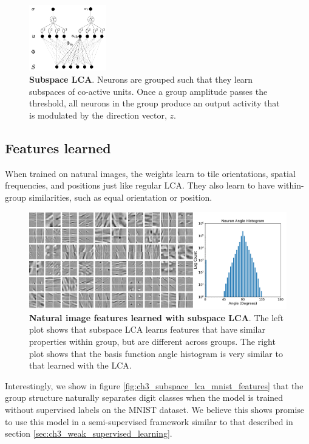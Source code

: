 \begin{figure}[h]
    \centering
    \includegraphics[width=0.3\textwidth]{figures/subspace_lca_graph.png}
    \caption{\textbf{Subspace LCA}. Neurons are grouped such that they learn subspaces of co-active units. Once a group amplitude passes the threshold, all neurons in the group produce an output activity that is modulated by the direction vector, $z$.}
    \label{fig:ch3_subspace_lca_graph}
\end{figure}

\subsection{Features learned}
When trained on natural images, the weights learn to tile orientations, spatial frequencies, and positions just like regular LCA. They also learn to have within-group similarities, such as equal orientation or position.

\begin{figure}[h]
    \centering
    \includegraphics[width=\textwidth]{figures/subspace_lca_vh_features.png}
    \caption{\textbf{Natural image features learned with subspace LCA}. The left plot shows that subspace LCA learns features that have similar properties within group, but are different across groups. The right plot shows that the basis function angle histogram is very similar to that learned with the LCA.}
    \label{fig:ch3_subspace_lca_vh_features}
\end{figure}

Interestingly, we show in figure \ref{fig:ch3_subspace_lca_mnist_features} that the group structure naturally separates digit classes when the model is trained without supervised labels on the MNIST dataset. We believe this shows promise to use this model in a semi-supervised framework similar to that described in section \ref{sec:ch3_weak_supervised_learning}.

